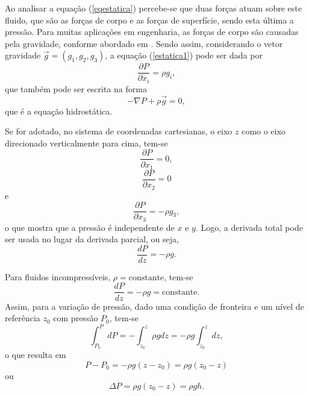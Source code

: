 Ao analisar a equação (\ref{eqestatica}) percebe-se que duas forças atuam sobre este fluido, que são as forças de corpo e as forças de superfície, sendo esta última a pressão. Para muitas aplicações em engenharia, as forças de corpo são causadas pela gravidade, conforme abordado em . Sendo assim, considerando o vetor gravidade $ \vec{g} = ( g_1 , g_2 , g_3) $, a equação (\ref{estatica1}) pode ser dada por
\begin{equation}
\dfrac{ \partial P}{ \partial x_{i}} = \rho g_{i},
\end{equation}
que também pode ser escrita na forma
\begin{equation} \label{eqhidro}
- \nabla P + \rho \vec{g} = 0,
\end{equation}
que é a equação hidrostática.

Se for adotado, no sistema de coordenadas cartesianas, o eixo $z$ como o eixo direcionado verticalmente para cima, tem-se
\begin{equation}
\dfrac{ \partial P}{ \partial x_{1}} = 0,
\end{equation}
\begin{equation}
\dfrac{ \partial P}{ \partial x_{2}} = 0
\end{equation}
e
\begin{equation}
\dfrac{ \partial P}{ \partial x_{3}} = - \rho g_{3},
\end{equation}
o que mostra que a pressão é independente de $x$ e $y$. Logo, a derivada total pode ser usada no lugar da derivada parcial, ou seja,
\begin{equation} \label{pressaoz}
\dfrac{ dP}{ dz} = - \rho g.
\end{equation}

Para fluidos incompressíveis, $ \rho =\mbox{constante}$, tem-se
\begin{equation} \label{pctante}
\dfrac{ dP}{ dz} = - \rho g = \mbox{constante}.
\end{equation}
Assim, para a variação de pressão, dado uma condição de fronteira e um nível de referência $ z_0 $ com pressão $ P_0 $, tem-se
\begin{equation}
\int^{ P}_{ P_0} {dP} = - \int^{z}_{z_0} { \rho g dz} = - \rho g \int^{z}_{z_0} {dz},
\end{equation}
o que resulta em 
\begin{equation}
P - P_{0} = - \rho g (z-z_0) = \rho g (z_0 - z)
\end{equation}
ou
\begin{equation} \label{varpres}
\Delta P = \rho g (z_0 - z) = \rho g h.
\end{equation}

